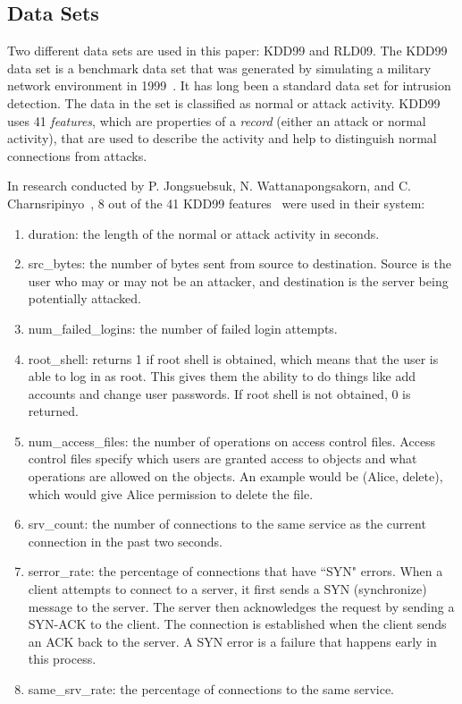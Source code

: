 \documentclass{sig-alternate}
\begin{document}
\subsection{Data Sets}
\label{sec:dataSets}
Two different data sets are used in this paper: KDD99 and RLD09. The KDD99 data set is a benchmark data set that was generated by simulating a military network environment in 1999~\cite{6559603}. It has long been a standard data set for intrusion detection. The data in the set is classified as normal or attack activity. KDD99 uses 41 \emph{features}, which are properties of a \emph{record} (either an attack or normal activity), that are used to describe the activity and help to distinguish normal connections from attacks. 

In research conducted by P. Jongsuebsuk, N. Wattanapongsakorn, and
C. Charnsripinyo~\cite{6496342, 6559603}, 8 out of the 41 KDD99 features~\cite{KDD99} were used in their system:
\begin{enumerate}
  \item duration: the length of the normal or attack activity in seconds.
  \item src\_bytes: the number of bytes sent from source to destination. Source is the user who may or may not be an attacker, and destination is the server being potentially attacked.
  \item num\_failed\_logins: the number of failed login attempts.
  \item root\_shell: returns 1 if root shell is obtained, which means that the user is able to log in as root. This gives them the ability to do things like add accounts and change user passwords. If root shell is not obtained, 0 is returned.
  \item num\_access\_files: the number of operations on access control files. Access control files specify which users are granted access to objects and what operations are allowed on the objects. An example would be (Alice, delete), which would give Alice permission to delete the file.~\cite{accessControl}
  \item srv\_count: the number of connections to the same service as the current connection in the past two seconds.
  \item serror\_rate: the percentage of connections that have ``SYN" errors. When a client attempts to connect to a server, it first sends a SYN (synchronize) message to the server. The server then acknowledges the request by sending a SYN-ACK to the client. The connection is established when the client sends an ACK back to the server. A SYN error is a failure that happens early in this process.~\cite{TCP}
  \item same\_srv\_rate: the percentage of connections to the same service.
\end{enumerate}
\end{document}
